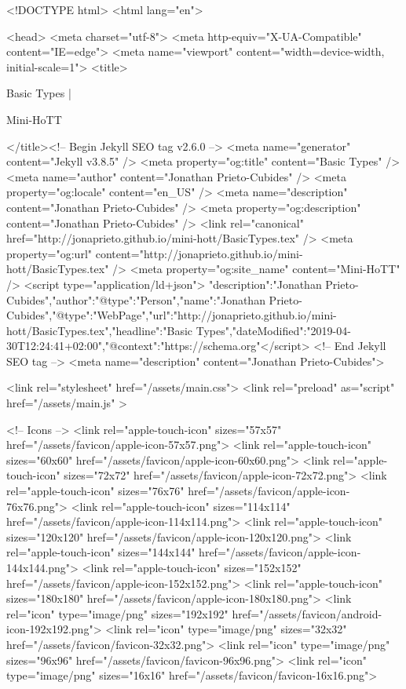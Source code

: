 <!DOCTYPE html>
<html lang="en">

<head>
  <meta charset="utf-8">
  <meta http-equiv="X-UA-Compatible" content="IE=edge">
  <meta name="viewport" content="width=device-width, initial-scale=1">
  <title>
    
      
        Basic Types |
      
        Mini-HoTT
    
  </title><!-- Begin Jekyll SEO tag v2.6.0 -->
<meta name="generator" content="Jekyll v3.8.5" />
<meta property="og:title" content="Basic Types" />
<meta name="author" content="Jonathan Prieto-Cubides" />
<meta property="og:locale" content="en_US" />
<meta name="description" content="Jonathan Prieto-Cubides" />
<meta property="og:description" content="Jonathan Prieto-Cubides" />
<link rel="canonical" href="http://jonaprieto.github.io/mini-hott/BasicTypes.tex" />
<meta property="og:url" content="http://jonaprieto.github.io/mini-hott/BasicTypes.tex" />
<meta property="og:site_name" content="Mini-HoTT" />
<script type="application/ld+json">
{"description":"Jonathan Prieto-Cubides","author":{"@type":"Person","name":"Jonathan Prieto-Cubides"},"@type":"WebPage","url":"http://jonaprieto.github.io/mini-hott/BasicTypes.tex","headline":"Basic Types","dateModified":"2019-04-30T12:24:41+02:00","@context":"https://schema.org"}</script>
<!-- End Jekyll SEO tag -->
<meta name="description" content="Jonathan Prieto-Cubides">

  <link rel="stylesheet" href="/assets/main.css">
  <link rel="preload" as="script" href="/assets/main.js" >

  <!-- Icons -->
  <link rel="apple-touch-icon" sizes="57x57" href="/assets/favicon/apple-icon-57x57.png">
  <link rel="apple-touch-icon" sizes="60x60" href="/assets/favicon/apple-icon-60x60.png">
  <link rel="apple-touch-icon" sizes="72x72" href="/assets/favicon/apple-icon-72x72.png">
  <link rel="apple-touch-icon" sizes="76x76" href="/assets/favicon/apple-icon-76x76.png">
  <link rel="apple-touch-icon" sizes="114x114" href="/assets/favicon/apple-icon-114x114.png">
  <link rel="apple-touch-icon" sizes="120x120" href="/assets/favicon/apple-icon-120x120.png">
  <link rel="apple-touch-icon" sizes="144x144" href="/assets/favicon/apple-icon-144x144.png">
  <link rel="apple-touch-icon" sizes="152x152" href="/assets/favicon/apple-icon-152x152.png">
  <link rel="apple-touch-icon" sizes="180x180" href="/assets/favicon/apple-icon-180x180.png">
  <link rel="icon" type="image/png" sizes="192x192"  href="/assets/favicon/android-icon-192x192.png">
  <link rel="icon" type="image/png" sizes="32x32" href="/assets/favicon/favicon-32x32.png">
  <link rel="icon" type="image/png" sizes="96x96" href="/assets/favicon/favicon-96x96.png">
  <link rel="icon" type="image/png" sizes="16x16" href="/assets/favicon/favicon-16x16.png">

